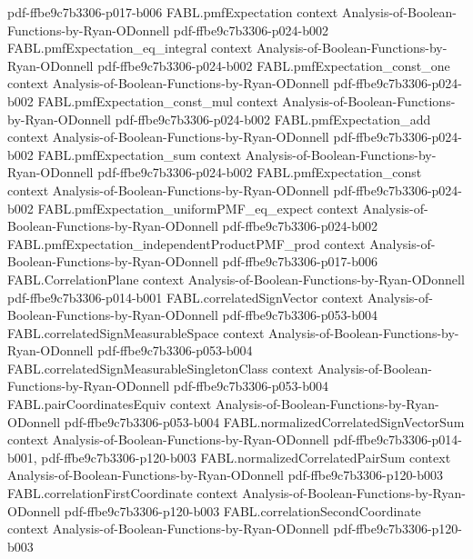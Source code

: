 \begin{theorem}
  {pdf-ffbe9c7b3306-p017-b006}
\proofstep
  {FABL.pmfExpectation}
  {context}
  {Analysis-of-Boolean-Functions-by-Ryan-ODonnell}
  {pdf-ffbe9c7b3306-p024-b002}
\proofstep
  {FABL.pmfExpectation_eq_integral}
  {context}
  {Analysis-of-Boolean-Functions-by-Ryan-ODonnell}
  {pdf-ffbe9c7b3306-p024-b002}
\proofstep
  {FABL.pmfExpectation_const_one}
  {context}
  {Analysis-of-Boolean-Functions-by-Ryan-ODonnell}
  {pdf-ffbe9c7b3306-p024-b002}
\proofstep
  {FABL.pmfExpectation_const_mul}
  {context}
  {Analysis-of-Boolean-Functions-by-Ryan-ODonnell}
  {pdf-ffbe9c7b3306-p024-b002}
\proofstep
  {FABL.pmfExpectation_add}
  {context}
  {Analysis-of-Boolean-Functions-by-Ryan-ODonnell}
  {pdf-ffbe9c7b3306-p024-b002}
\proofstep
  {FABL.pmfExpectation_sum}
  {context}
  {Analysis-of-Boolean-Functions-by-Ryan-ODonnell}
  {pdf-ffbe9c7b3306-p024-b002}
\proofstep
  {FABL.pmfExpectation_const}
  {context}
  {Analysis-of-Boolean-Functions-by-Ryan-ODonnell}
  {pdf-ffbe9c7b3306-p024-b002}
\proofstep
  {FABL.pmfExpectation_uniformPMF_eq_expect}
  {context}
  {Analysis-of-Boolean-Functions-by-Ryan-ODonnell}
  {pdf-ffbe9c7b3306-p024-b002}
\proofstep
  {FABL.pmfExpectation_independentProductPMF_prod}
  {context}
  {Analysis-of-Boolean-Functions-by-Ryan-ODonnell}
  {pdf-ffbe9c7b3306-p017-b006}
\proofstep
  {FABL.CorrelationPlane}
  {context}
  {Analysis-of-Boolean-Functions-by-Ryan-ODonnell}
  {pdf-ffbe9c7b3306-p014-b001}
\proofstep
  {FABL.correlatedSignVector}
  {context}
  {Analysis-of-Boolean-Functions-by-Ryan-ODonnell}
  {pdf-ffbe9c7b3306-p053-b004}
\proofstep
  {FABL.correlatedSignMeasurableSpace}
  {context}
  {Analysis-of-Boolean-Functions-by-Ryan-ODonnell}
  {pdf-ffbe9c7b3306-p053-b004}
\proofstep
  {FABL.correlatedSignMeasurableSingletonClass}
  {context}
  {Analysis-of-Boolean-Functions-by-Ryan-ODonnell}
  {pdf-ffbe9c7b3306-p053-b004}
\proofstep
  {FABL.pairCoordinatesEquiv}
  {context}
  {Analysis-of-Boolean-Functions-by-Ryan-ODonnell}
  {pdf-ffbe9c7b3306-p053-b004}
\proofstep
  {FABL.normalizedCorrelatedSignVectorSum}
  {context}
  {Analysis-of-Boolean-Functions-by-Ryan-ODonnell}
  {pdf-ffbe9c7b3306-p014-b001,
    pdf-ffbe9c7b3306-p120-b003}
\proofstep
  {FABL.normalizedCorrelatedPairSum}
  {context}
  {Analysis-of-Boolean-Functions-by-Ryan-ODonnell}
  {pdf-ffbe9c7b3306-p120-b003}
\proofstep
  {FABL.correlationFirstCoordinate}
  {context}
  {Analysis-of-Boolean-Functions-by-Ryan-ODonnell}
  {pdf-ffbe9c7b3306-p120-b003}
\proofstep
  {FABL.correlationSecondCoordinate}
  {context}
  {Analysis-of-Boolean-Functions-by-Ryan-ODonnell}
  {pdf-ffbe9c7b3306-p120-b003}
\proofstep

\end{theorem}

